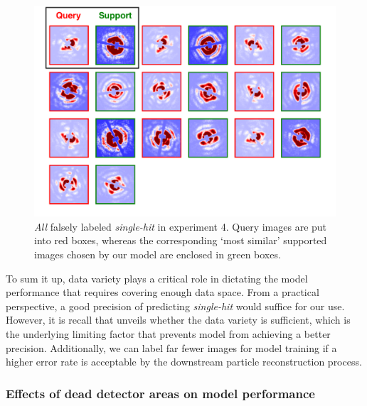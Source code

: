 \begin{figure}
\includegraphics[width=\textwidth,keepaspectratio]
{figures/false_label.single.real.pdf}

\caption{\textit{All} falsely labeled \textit{single-hit} in experiment 4.
Query images are put into red boxes, whereas the corresponding `most similar'
supported images chosen by our model are enclosed in green boxes.}

\label{fig : false single real}
\end{figure}


To sum it up, data variety plays a critical role in dictating the model
performance that requires covering enough data space.  From a practical
perspective, a good precision of predicting \textit{single-hit} would suffice
for our use.  However, it is recall that unveils whether the data variety is
sufficient, which is the underlying limiting factor that prevents model from
achieving a better precision.  Additionally, we can label far fewer images for
model training if a higher error rate is acceptable by the downstream particle
reconstruction process.  


\subsubsection{Effects of dead detector areas on model performance}

